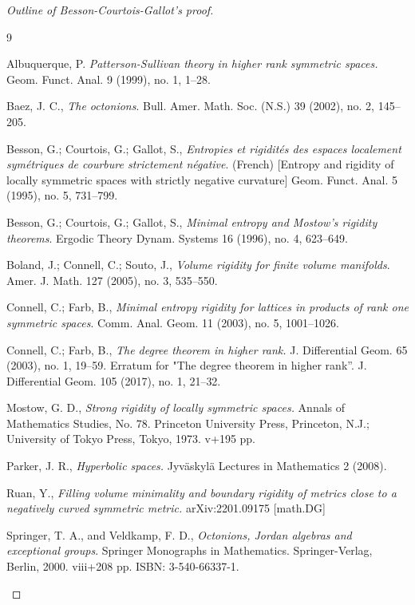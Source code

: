 \documentclass{article}
\theoremstyle{definition}
\begin{document}
\begin{proof}[Outline of Besson-Courtois-Gallot's proof]
\begin{thebibliography}{9}

Albuquerque, P.
\textit{Patterson-Sullivan theory in higher rank symmetric spaces. }
Geom. Funct. Anal. 9 (1999), no. 1, 1–28.


Baez, J. C., \textit{The octonions}. Bull. Amer. Math. Soc. (N.S.) 39 (2002), no. 2, 145–205.

 Besson, G.; Courtois, G.; Gallot, S., \textit{Entropies et rigidités des espaces localement symétriques de courbure strictement négative}. (French) [Entropy and rigidity of locally symmetric spaces with strictly negative curvature] Geom. Funct. Anal. 5 (1995), no. 5, 731–799.

 Besson, G.; Courtois, G.; Gallot, S., \textit{Minimal entropy and Mostow's rigidity theorems}. Ergodic Theory Dynam. Systems 16 (1996), no. 4, 623–649.

 Boland, J.; Connell, C.; Souto, J., \textit{Volume rigidity for finite volume manifolds}. Amer. J. Math. 127 (2005), no. 3, 535–550.

Connell, C.; Farb, B., \textit{Minimal entropy rigidity for lattices in products of rank one symmetric spaces}. Comm. Anal. Geom. 11 (2003), no. 5, 1001–1026.


 Connell, C.; Farb, B.,\textit{ The degree theorem in higher rank.} J. Differential Geom. 65 (2003), no. 1, 19–59.
Erratum for "The degree theorem in higher rank''. J. Differential Geom. 105 (2017), no. 1, 21–32.


Mostow, G. D., \textit{Strong rigidity of locally symmetric spaces.} Annals of Mathematics Studies, No. 78. Princeton University Press, Princeton, N.J.; University of Tokyo Press, Tokyo, 1973. v+195 pp.


Parker, J. R., \textit{Hyperbolic spaces.} Jyväskylä Lectures in Mathematics 2 (2008).


Ruan, Y., \textit{Filling volume minimality and boundary rigidity of metrics close to a negatively curved symmetric metric.} arXiv:2201.09175 [math.DG]


Springer, T. A., and Veldkamp, F. D., \textit{Octonions, Jordan algebras and exceptional groups}. Springer Monographs in Mathematics. Springer-Verlag, Berlin, 2000. viii+208 pp. ISBN: 3-540-66337-1.


\end{thebibliography}
\end{proof}
\end{document}
